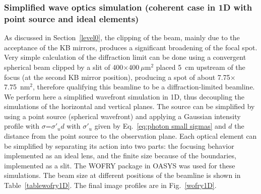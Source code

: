 \documentclass{iucr}              %
\newcommand{\inred}[1]{{\color{black}#1}}
\begin{document}
\subsubsection{Simplified wave optics simulation (coherent case in 1D with point source and ideal elements)}
\label{wofry}

As discussed in Section~\ref{level0}, the clipping of the beam, mainly due to the acceptance of the KB mirrors\inred{,} produces a significant broadening of the focal spot.  Very simple calculation of the diffraction limit can be done using a convergent spherical beam clipped by a slit of 400$\times$400$~\mu$m$^2$ placed 5~cm upstream of the focus (at the second KB mirror position), producing a spot of about 7.75$\times$7.75~nm$^2$, therefore qualifying this beamline to be a diffraction-limited beamline. We perform here a simplified wavefront simulation in 1D, thus decoupling the simulations of the horizontal and vertical planes. The source can be simplified by using a point source (spherical wavefront) and applying a Gaussian intensity profile with $\sigma$=$\sigma'_u d$ with $\sigma'_u$ given by Eq.~\ref{eq:photon small sigmas} and $d$ the distance from the point source to the observation plane. Each optical element can be simplified by separating its action into two parts: the focusing behavior implemented as an ideal lens, and the finite size because of the boundaries, implemented as a slit. The WOFRY package \cite{codeWOFRY} in OASYS was used for these simulations. The beam size at different positions of the beamline is shown in Table~\ref{tablewofry1D}. The final image profiles are in Fig.~\ref{wofry1D}.

\begin{table}[]
    \centering
    \caption{Beam sizes calculated with simplified wave optics propagation (point source and ideal lenses with aperture for modeling the element dimensions). The zoom or scaling factor used for the propagation is also displayed. 
    }
    \label{tablewofry1D}
\end{table}
\end{document}
